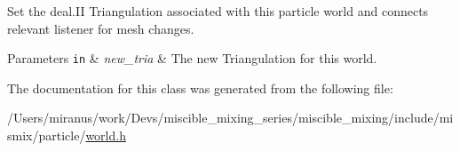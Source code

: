 Set the deal.\+I\+I Triangulation associated with this particle world and connects relevant listener for mesh changes. 


\begin{DoxyParams}[1]{Parameters}
\mbox{\tt in}  & {\em new\+\_\+tria} & The new Triangulation for this world. \\
\hline
\end{DoxyParams}


The documentation for this class was generated from the following file\+:\begin{DoxyCompactItemize}
\item 
/\+Users/miranus/work/\+Devs/miscible\+\_\+mixing\+\_\+series/miscible\+\_\+mixing/include/mismix/particle/\hyperlink{world_8h}{world.\+h}\end{DoxyCompactItemize}
